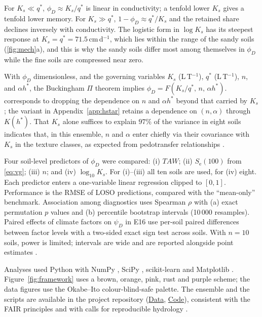 \documentclass[preprint,12pt,authoryear]{elsarticle}
\newcommand{\Se}{S_{\mathrm{e}}}
\newcommand{\TAW}{\mathit{TAW}}
\newcommand{\repourl}{https://github.com/halilunaziru73-creator/Coupled-Water-Fluxes-Pore-Scale-Dynamics-Precision-Irrigation-Mulching-Feedback-Loops}
\newcommand{\dataurl}{\repourl/tree/main/Data}
\newcommand{\codeurl}{\repourl/tree/main/Manuscripts}
\newcommand{\datalink}{\href{\dataurl}{Data}}
\newcommand{\codelink}{\href{\codeurl}{Code}}
\begin{document}
For $K_s\ll q^\ast$, $\phi_D\approx K_s/q^\ast$ is linear in conductivity; a tenfold lower $K_s$ gives a tenfold lower memory. For $K_s\gg q^\ast$, $1-\phi_D\approx q^\ast/K_s$ and the retained share declines inversely with conductivity. The logistic form in $\log K_s$ has its steepest response at $K_s=q^\ast=71.5$\,cm\,d$^{-1}$, which lies within the range of the sandy soils (\cref{fig:mech}a), and this is why the sandy soils differ most among themselves in $\phi_D$ while the fine soils are compressed near zero.

With $\phi_D$ dimensionless, and the governing variables $K_s$ (L\,T$^{-1}$), $q^\ast$ (L\,T$^{-1}$), $n$, and $\alpha h^\ast$, the Buckingham $\Pi$ theorem \citep{Buckingham1914} implies $\phi_D=F(K_s/q^\ast,\,n,\,\alpha h^\ast)$.  corresponds to dropping the dependence on $n$ and $\alpha h^\ast$ beyond that carried by $K_s$; the variant in Appendix~\ref{app:hstar} retains a dependence on $(n,\alpha)$ through $K(h^\ast)$. That $K_s$ alone suffices to explain $97\%$ of the variance in eight soils indicates that, in this ensemble, $n$ and $\alpha$ enter chiefly via their covariance with $K_s$ in the texture classes, as expected from pedotransfer relationships \citep{Schaap2001,Saxton2006}.

Four soil-level predictors of $\phi_D$ were compared: (i) $\TAW$; (ii) $\Se(100)$ from \cref{eq:vg}; (iii) $n$; and (iv) $\log_{10}K_s$. For (i)--(iii) all ten soils are used, for (iv) eight. Each predictor enters a one-variable linear regression clipped to $[0,1]$. Performance is the RMSE of LOSO predictions, compared with the ``mean-only'' benchmark. Association among diagnostics uses Spearman $\rho$ with (a) exact permutation $p$ values and (b) percentile bootstrap intervals (10\,000 resamples). Paired effects of climate factors on $\psi_D$ in E16 use per-soil paired differences between factor levels with a two-sided exact sign test across soils. With $n=10$ soils, power is limited; intervals are wide and are reported alongside point estimates \citep{Efron1993,Good2005}.

Analyses used Python with NumPy \citep{Harris2020}, SciPy \citep{Virtanen2020}, scikit-learn \citep{Pedregosa2011} and Matplotlib \citep{Hunter2007}. Figure~\ref{fig:framework} uses a brown, orange, pink, rust and purple scheme; the data figures use the Okabe--Ito colour-blind-safe palette. The ensemble and the scripts are available in the project repository (\datalink, \codelink), consistent with the FAIR principles \citep{Wilkinson2016} and with calls for reproducible hydrology \citep{Hutton2016}.
\end{document}
